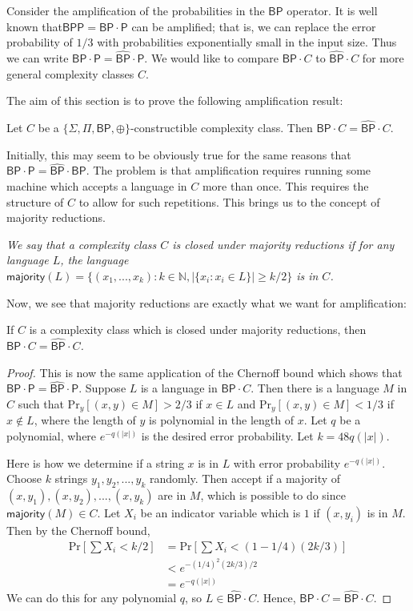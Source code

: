 \documentclass[11pt]{article}
\newcommand{\pr}{\text{Pr}}
\newcommand{\bp}{\textsf{BP}}
\newcommand{\strongbp}{\widehat{\textsf{BP}}}
\newcommand{\bpp}{\textsf{BPP}}
\newcommand{\parity}{\oplus}
\newcommand{\p}{\textsf{P}}
\newcommand{\majority}{\textsf{majority}}
\begin{document}
Consider the amplification of the probabilities in the $\bp$ operator. It is well known that\linebreak $\bpp = \bp \cdot \p$ can be amplified; that is, we can replace the error probability of $1/3$ with probabilities exponentially small in the input size. Thus we can write $\bp \cdot \p = \strongbp \cdot \p$. We would like to compare $\bp \cdot C$ to $\strongbp \cdot C$ for more general complexity classes $C$.

The aim of this section is to prove the following amplification result:

\begin{theorem}\label{amplify}
Let $C$ be a \emph{$\{\Sigma,\Pi,\bp,\parity\}$}-constructible complexity class. Then \emph{$\bp \cdot C = \strongbp \cdot C$}.
\end{theorem}
Initially, this may seem to be obviously true for the same reasons that $\bp \cdot \p = \strongbp \cdot \bp$. The problem is that amplification requires running some machine which accepts a language in $C$ more than once. This requires the structure of $C$ to allow for such repetitions. This brings us to the concept of majority reductions.
\begin{definition}\label{defmajority}\emph{
We say that a complexity class $C$ is \emph{closed under majority reductions} if for any language $L$, the language $\majority(L) = \{(x_1,...,x_k) : k \in \mathbb{N}, |\{x_i : x_i \in L\}| \ge k/2\}$ is in $C$.
}\end{definition}
Now, we see that majority reductions are exactly what we want for amplification:
\begin{lemma}\label{majorityimpliesamplify}
If $C$ is a complexity class which is closed under majority reductions, then\linebreak \emph{$\bp \cdot C = \strongbp \cdot C$.}
\end{lemma}
\begin{proof}
This is now the same application of the Chernoff bound which shows that $\bp \cdot \p = \strongbp \cdot \p$. Suppose $L$ is a language in $\bp \cdot C$. Then there is a language $M$ in $C$ such that $\pr_y [(x,y) \in M] > 2/3$ if $x\in L$ and $\pr_y [(x,y)\in M] < 1/3$ if $x\not\in L$, where the length of $y$ is polynomial in the length of $x$. Let $q$ be a polynomial, where $e^{-q(|x|)}$ is the desired error probability. Let $k = 48q(|x|)$.

Here is how we determine if a string $x$ is in $L$ with error probability $e^{-q(|x|)}$. Choose $k$ strings $y_1,y_2,...,y_k$ randomly. Then accept if a majority of $(x,y_1),(x,y_2),...,(x,y_k)$ are in $M$, which is possible to do since $\majority(M) \in C$. Let $X_i$ be an indicator variable which is $1$ if $(x,y_i)$ is in $M$. Then by the Chernoff bound,
\begin{align*}
\pr\left[\sum X_i < k/2\right] &= \pr\left[\sum X_i < (1 - 1/4)(2k/3)\right]\\
&< e^{-(1/4)^2 (2k/3) / 2}\\
&= e^{-q(|x|)}
\end{align*}
We can do this for any polynomial $q$, so $L \in \strongbp \cdot C$. Hence, $\bp \cdot C = \strongbp \cdot C$.
\end{proof}
\end{document}
